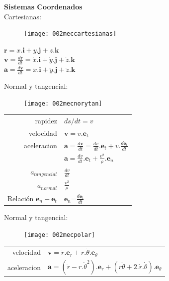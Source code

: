 \documentclass[11pt,a4paper,twocolumn]{article}
\begin{document}
	\textbf{Sistemas Coordenados}\\
	Cartesianas:\\
		\begin{figure}[ht]
		\centering
		\texttt{[image: 002meccartesianas]}
	\end{figure}
		\begin{center}
		$\textbf{r}=x.\textbf{i}+y.\textbf{j}+z.\textbf{k} $\\
		$\textbf{v}=\frac{d\textbf{r}}{dt}=\dot{x}.\textbf{i}+\dot{y}.\textbf{j}+\dot{z}.\textbf{k} $\\
		$\textbf{a}=\frac{d\textbf{v}}{dt}=\ddot{x}.\textbf{i}+\ddot{y}.\textbf{j}+\ddot{z}.\textbf{k} $\\
	\end{center}
\newpage
	Normal y tangencial:\\
	
		\begin{figure}[h]
		\centering
		\texttt{[image: 002mecnorytan]}
	\end{figure}
	\vspace{-0.4 cm}
	\begin{center}
		\begin{tabular}{r | l} 
			rapidez& $ds/dt=v$\\
			velocidad & $\textbf{v}=v.\textbf{e}_{t}$\\		
			aceleracion& $\textbf{a}=\frac{d\textbf{v}}{dt}=\frac{dv}{dt}.\textbf{e}_{t}+v.\frac{d\textbf{e}_{t}}{dt}$\\
			& $\textbf{a}=\frac{dv}{dt}.\textbf{e}_{t}+\frac{v^{2}}{\rho}.\textbf{e}_{n}$\\
			$a_{tangencial}$&$\frac{dv}{dt}$\\
			$a_{normal}$&$\frac{v^{2}}{\rho}$\\
			Relación $\textbf{e}_{n}-\textbf{e}_{t}$&$\textbf{e}_{n}$=$\frac{d\textbf{e}_{t}}{dt}$\\
		\end{tabular}
	\end{center}

	Normal y tangencial:\\

	\begin{figure}[h]
		\centering
		\texttt{[image: 002mecpolar]}
	\end{figure}
	\vspace{-0.4 cm}
	\begin{center}
		\begin{tabular}{r | l} 
			velocidad & $\textbf{v}=\dot{r}.\textbf{e}_{r}+r.\dot{\theta}.\textbf{e}_{\theta}$\\		
			aceleracion& $\textbf{a}=(\ddot{r}-r.\dot{\theta}^{2}).\textbf{e}_{r}+(r\ddot{\theta}+2.\dot{r}.\dot{\theta}).\textbf{e}_{\theta}$\\
		\end{tabular}
	\end{center}
	
\end{document}

